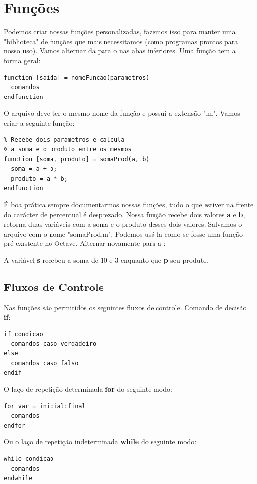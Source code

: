 \documentclass[a4paper,11pt]{article}
\begin{document}
\section{Funções}
Podemos criar nossas funções personalizadas, fazemos isso para manter uma "biblioteca" de funções que mais necessitamos (como programas prontos para nosso uso). Vamos alternar da  para o  nas abas inferiores. Uma função tem a forma geral:
\begin{lstlisting}[]
function [saida] = nomeFuncao(parametros)
  comandos
endfunction
\end{lstlisting}

O arquivo deve ter o mesmo nome da função e possui a extensão ".m". Vamos criar a seguinte função:
\begin{lstlisting}[]
% somaProd
% Recebe dois parametros e calcula
% a soma e o produto entre os mesmos
function [soma, produto] = somaProd(a, b)
  soma = a + b;
  produto = a * b;
endfunction
\end{lstlisting}

É boa prática sempre documentarmos nossas funções, tudo o que estiver na frente do carácter de percentual é desprezado. Nossa função recebe dois valores \textbf{a} e \textbf{b}, retorna duas variáveis com a soma e o produto desses dois valores. Salvamos o arquivo com o nome "somaProd.m". Podemos usá-la  como se fosse uma função pré-existente no Octave. Alternar novamente para a : \\

A variável \textbf{s} recebeu a soma de 10 e 3 enquanto que \textbf{p} seu produto.

\subsection{Fluxos de Controle}
Nas funções são permitidos os seguintes fluxos de controle. Comando de decisão \textbf{if}:
\begin{lstlisting}[]
if condicao
  comandos caso verdadeiro
else 
  comandos caso falso 
endif
\end{lstlisting}

O laço de repetição determinada \textbf{for} do seguinte modo:
\begin{lstlisting}[]
for var = inicial:final
  comandos
endfor
\end{lstlisting}

Ou o laço de repetição indeterminada \textbf{while} do seguinte modo:
\begin{lstlisting}[]
while condicao
  comandos
endwhile
\end{lstlisting}
\end{document}
